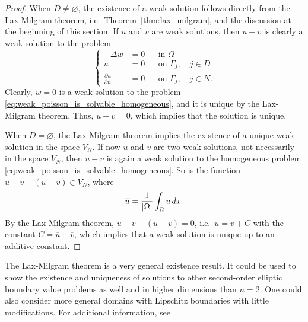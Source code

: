 \documentclass[english, 12pt, a4paper, sci, utf8, a-2b, online]{aaltothesis}
\theoremstyle{definition}
\theoremstyle{plain}
\DeclarePairedDelimiter\abs{\lvert}{\rvert}
\newcommand*\diff{\mathop{}\!d}
\numberwithin{equation}{section}
\begin{document}
\begin{proof}
    When $D \neq \varnothing$, the existence of a weak solution follows
    directly from the Lax-Milgram theorem, i.e.\ Theorem~\ref{thm:lax_milgram},
    and the discussion at the beginning of this section.
    If $u$ and $v$ are weak solutions, then $u-v$ is clearly
    a weak solution to the problem
    \begin{equation}
        \label{eq:weak_poisson_is_solvable_homogeneous}
        \left\{
            \begin{aligned}
                -\Delta w &= 0 && \text{in } \Omega \\
                u &= 0 && \text{on } \Gamma_j, \quad j \in D \\
                \frac{\partial u}{\partial n} &= 0 && \text{on } \Gamma_j,
                \quad j \in N.
            \end{aligned}
        \right.
    \end{equation}
    Clearly, $w = 0$ is a weak solution to the problem 
    \eqref{eq:weak_poisson_is_solvable_homogeneous}, and it is unique
    by the Lax-Milgram theorem. Thus, $u - v = 0$, which implies that the solution is unique.

    When $D = \varnothing$, the Lax-Milgram theorem implies the existence
    of a unique weak solution in the space $V_N$. If now $u$ and $v$ are two
    weak solutions, not necessarily in the space $V_N$, then $u-v$ is again
    a weak solution to the homogeneous problem 
    \eqref{eq:weak_poisson_is_solvable_homogeneous}.
    So is the function $u-v - (\overline{u} - \overline{v}) \in V_N$, where
    \begin{equation*}
        \overline{u} = \frac{1}{\abs{\Omega}} \int_{\Omega} u \diff x.
    \end{equation*}
    By the Lax-Milgram theorem, $u-v-(\overline{u} - \overline{v}) = 0$,
    i.e.\ $u = v + C$ with the constant $C = \overline{u} - \overline{v}$,
    which implies that a weak solution is unique up to an additive constant.
\end{proof}

The Lax-Milgram theorem is a very general existence result.
It could be used to show the existence and uniqueness of solutions
to other second-order elliptic boundary value problems as well
and in higher dimensions than $n=2$. One could also consider more
general domains with Lipschitz boundaries with little modifications.
For additional information, see \cite[Chapter 6]{evans2010}.
\end{document}
